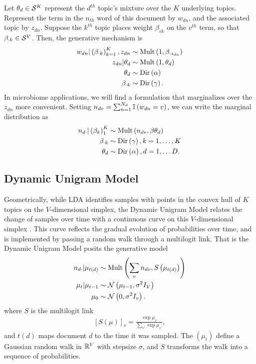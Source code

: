 \documentclass[oupdraft]{bio}
\begin{document}
Let $\theta_{d} \in \mathcal{S}^{K}$ represent the $d^{th}$ topic's mixture over the
$K$ underlying topics. Represent the term in the $n_{th}$ word of this document
by $w_{dn}$, and the associated topic by $z_{dn}$. Suppose the $k^{th}$ topic
places weight $\beta_{vk}$ on the $v^{th}$ term, so that $\beta_{\cdot k} \in
\mathcal{S}^{V}$. Then, the generative mechanism is
\begin{align*}
w_{dn} \vert \left(\beta_{\cdot k}\right)_{k = 1}^{K}, z_{dn} &\sim \textnormal{Mult}\left(1, \beta_{\cdot z_{dn}}\right) \\
z_{dn} \vert \theta_{d} &\sim \textnormal{Mult}\left(1, \theta_{d}\right) \\
\theta_{d} &\sim \textnormal{Dir}\left(\alpha\right) \\
\beta_{\cdot k} &\sim \textnormal{Dir}\left(\gamma\right).
\end{align*}
In microbiome applications, we will find a formulation that marginalizes over
the $z_{dn}$ more convenient. Setting $n_{dv} = \sum_{n = 1}^{N_{d}}
\mathbb{I}\left({w_{dn} = v}\right)$, we can write the marginal distribution as
\begin{align*}
n_{d\cdot} \vert \left(\beta_{k}\right)_{1}^{K} &\sim \textnormal{Mult}\left(n_{d\ast}, \beta \theta_{d}\right) \\
\beta_{\cdot k} &\sim \textnormal{Dir}\left(\gamma\right), k = 1, \dots, K \\
\theta_{d} &\sim \textnormal{Dir}\left(\alpha\right), d = 1, \dots D.
\end{align*}

\subsection{Dynamic Unigram Model}

Geometrically, while LDA identifies samples with points in the convex hull of
$K$ topics on the $V$-dimensional simplex, the Dynamic Unigram Model relates the
change of samples over time with a continuous curve on this $V$-dimensional
simplex \citep{blei2006dynamic}. This curve reflects the gradual evolution of
probabilities over time, and is implemented by passing a random walk through a
multilogit link. That is the Dynamic Unigram Model posits the generative model
\begin{align*}
n_{d\cdot} \vert \mu_{t\left(d\right)}  &\sim \textnormal{Mult}\left(\sum_{v} n_{dv}, S\left(\mu_{t\left(d\right)}\right)\right) \\
\mu_{t} \vert \mu_{t - 1} &\sim \mathcal{N}\left(\mu_{t - 1}, \sigma^{2}I_{V}\right) \\
\mu_{0} &\sim \mathcal{N}\left(0, \sigma^{2}I_{v}\right).
\end{align*}
where $S$ is the multilogit link
\begin{align*}
\left[S\left(\mu\right)\right]_{v} = \frac{\exp{\mu_{v}}}{\sum_{v^{\prime}} \exp{\mu_{v^{\prime}}}},
\end{align*}
and $t\left(d\right)$ maps document $d$ to the time it was sampled. The
$\left(\mu_{t}\right)$ define a Gaussian random walk in $\mathbb{R}^{V}$ with
stepsize $\sigma$, and $S$ transforms the walk into a sequence of probabilities.
\end{document}
